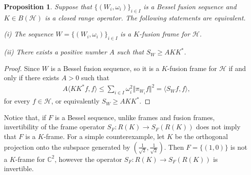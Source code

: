 \documentclass{birkjour}
\newtheorem{prop}[thm]{Proposition}
\theoremstyle{definition}
\theoremstyle{remark}
\numberwithin{equation}{section}
\begin{document}
\begin{prop}\label{2.3.}
Suppose that $\lbrace(W_{i},\omega_{i})\rbrace_{i\in I}$ is a Bessel fusion sequence
and $K\in B(\mathcal{H})$ is  a closed range operator. The following statements are equivalent.
\item[(i)] The sequence
 $W=\{(W_{i}, \omega_{i})\}_{i\in I}$  is a $K$-fusion frame for $\mathcal{H}$.
\item[(ii)]
 There exists a positive number  $A$  such that $S_{W}\geq AKK^{*}$.
\end{prop}
\begin{proof}
Since $W$ is a Bessel fusion sequence, so it  is a $K$-fusion frame for $\mathcal{H}$  if and only if there exists $A>0$ such that
 \begin{eqnarray*}
A  \langle KK^{*}f, f\rangle  \leq\sum_{i\in I}\omega_{i}^{2}\Vert \pi_{W_{i}}f \Vert^{2}= \langle S_{W}f, f\rangle,
 \end{eqnarray*}
 for every $f\in \mathcal{H}$, or  equivalently $S_{W}\geq AKK^{*}$.
\end{proof}
Notice that,  if $F$ is a Bessel sequence, unlike frames and fusion frames, invertibility of  the frame operator $S_{F}: R(K)\rightarrow S_{F}(R(K))$ does not imply that $F$ is a $K$-frame. For a simple counterexample,   let $K$  be the orthogonal projection onto the subspace generated by $(\frac{1}{\sqrt{2}}, \frac{1}{\sqrt{2}})$. Then $F=\{(1,0)\}$ is not a $K$-frame for  $\mathbb{C}^{2}$, however the operator  $S_{F}:R(K)\rightarrow S_{F}(R(K))$ is invertible.
\end{document}
